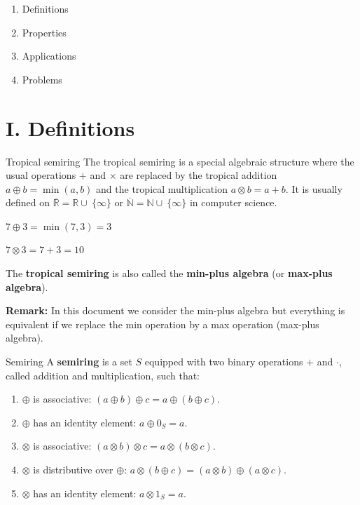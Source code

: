 \documentclass{article}
\begin{document}

\begin{mysummary}{}
  \begin{enumerate}[label=\Roman*., leftmargin=*, nosep]
    \item Definitions
    \item Properties 
    \item Applications
    \item Problems
  \end{enumerate}
\end{mysummary}

\section*{I. Definitions}

\begin{mydefinition}{Tropical semiring}
    The tropical semiring is a special algebraic structure where the usual operations $+$ and $\times$ are replaced by the tropical addition $a \oplus b = \min(a, b)$ and the tropical multiplication $a \otimes b = a + b$. It is usually defined on $\overline{\mathbb{R}} = \mathbb{R} \cup \ \{\infty\}$ or $\overline{\mathbb{N}} = \mathbb{N} \cup \ \{\infty\}$ in computer science.
\end{mydefinition}
    
\begin{myexample}{}
$7 \oplus 3 = \min(7, 3) = 3$

$7 \otimes 3 = 7 + 3 = 10$   
\end{myexample}

The \textbf{tropical semiring} is also called the \textbf{min-plus algebra} (or \textbf{max-plus algebra}).

\textbf{Remark:} In this document we consider the min-plus algebra but everything is equivalent if we replace the min operation by a max operation (max-plus algebra).


\begin{mydefinition}{Semiring}
A \textbf{semiring} is a set $S$ equipped with two binary operations $+$ and $\cdot$, called addition and multiplication, such that:
\begin{enumerate}
    \item $\oplus$ is associative: $(a \oplus b) \oplus c = a \oplus (b \oplus c)$.
    \item $\oplus$ has an identity element: $a \oplus 0_S = a$.
    \item $\otimes$ is associative: $(a \otimes b) \otimes c = a \otimes (b \otimes c)$.
    \item $\otimes$ is distributive over $\oplus$: $a \otimes (b \oplus c) = (a \otimes b) \oplus (a \otimes c)$.
    \item $\otimes$ has an identity element: $a \otimes 1_S = a$.
\end{enumerate}
\end{mydefinition}
\end{document}
